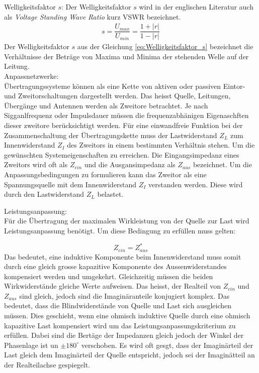 Welligkeitsfaktor $s$:
Der Welligkeitsfaktor $s$ wird in der englischen Literatur auch als \textit{Voltage Standing Wave Ratio} kurz VSWR bezeichnet.
\begin{eqnarray}\label{eq:Welligkeitsfaktor_s}
s=\dfrac{U_{max}}{U_{min}}=\dfrac{1+|r|}{1-|r|}
\end{eqnarray}
Der Welligkeitsfaktor $s$ aus der Gleichung \ref{eq:Welligkeitsfaktor_s} bezeichnet die Verhältnisse der Beträge von Maxima und Minima der stehenden Welle auf der Leitung\cite{Tekom}.\\


Anpassnetzwerke: \\
Übertragungssysteme können als eine Kette von aktiven oder passiven Eintor- und Zweitorschaltungen dargestellt werden. Das heisst Quelle, Leitungen, Übergänge und Antennen werden als Zweitore betrachtet. Je nach Sigganlfrequenz oder Impulsdauer müssen die frequenzabhänigen Eigenaschften dieser zweitore berücksichtigt werden. Für eine einwandfreie Funktion bei der Zusammenschaltung der Übertragungskette muss der Lastwiderstand $Z_L$ zum Innenwiderstand $Z_I$ des Zweitors in einem bestimmten Verhältnis stehen. Um die gewünschten Systemeigenschaften zu erreichen. Die Eingangsimpedanz eines Zweitors wird oft als $Z_{ein}$ und die Ausgansimpedanz als $Z_{aus}$ bezeichnet. 
Um die Anpassungsbedingungen zu formulieren kann das Zweitor als eine Spannungsquelle mit dem Innenwiderstand $Z_I$ verstanden werden. Diese wird  durch den Lastwiderstand $Z_L$ belastet.

Leistungsanpassung: \\
Für die Übertragung der maximalen Wirkleistung von der Quelle zur Last  wird Leistungsanpassung benötigt. Um diese Bedingung zu erfüllen muss gelten:

\[Z_{ein} = Z_{aus}^*\]
Das bedeutet, eine induktive Komponente beim Innenwiderstand muss somit durch eine gleich grosse kapazitive Komponente des Aussenwiderstandes kompensiert werden und umgekehrt. Gleichzeitig müssen die beiden Wirkwiderstände gleiche Werte aufweisen. Das heisst, der Realteil von $Z_{ein}$ und $Z_{aus}$ sind gleich, jedoch sind die Imaginäranteile konjugiert komplex. Das bedeutet, dass die Blindwiderstände von Quelle und Last sich ausgleichen müssen. Dies geschieht, wenn eine ohmisch induktive Quelle durch eine ohmisch kapazitive Last kompensiert wird um das Leistungsanpassungskriterium zu erfüllen. Dabei sind die Bertäge der Impedanzen gleich jedoch der Winkel der Phasenlage ist un $\pm 180^\circ$  verschoben. Es wird oft gesgt, dass der Imaginärteil der Last gleich dem Imaginärteil der Quelle entspricht, jedoch sei der Imaginätteil an der Realteilachse gespiegelt.\\

